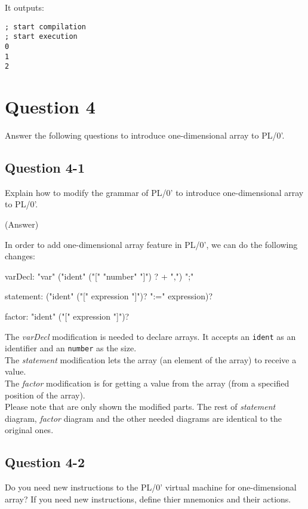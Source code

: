 \documentclass{article}
\begin{document}
It outputs:
\begin{verbatim}
; start compilation
; start execution
0 
1 
2 
\end{verbatim}


\newpage
\section*{Question 4}
Answer the following questions to introduce one-dimensional array to PL/0'.


\subsection*{Question 4-1}
Explain how to modify the grammar of PL/0' to introduce one-dimensional array to PL/0'.

\ifreport
(Answer)\\
\fi

In order to add one-dimensional array feature in PL/0', we can do the following
changes:

\begin{rail}
    varDecl: "var" ("ident" ("[" "number" "]") ? + ",") ";"
\end{rail}

\begin{rail}
    statement: ("ident" ("[" expression "]")? ":=" expression)?
\end{rail}

\begin{rail}
    factor: "ident" ("[" expression "]")?
\end{rail}

The {\it varDecl} modification is needed to declare arrays. It accepts an
{\tt ident} as an identifier and an {\tt number} as the size.\\
The {\it statement} modification lets the array (an element of the array) to
receive a value.\\
The {\it factor} modification is for getting a value from the array (from a
specified position of the array).\\
Please note that are only shown the modified parts.
The rest of {\it statement} diagram, {\it factor} diagram and the other needed
diagrams are identical to the original ones.\\

\subsection*{Question 4-2}
Do you need new instructions to the PL/0' virtual machine for one-dimensional array?
If you need new instructions, define thier mnemonics and their actions. 
\end{document}
